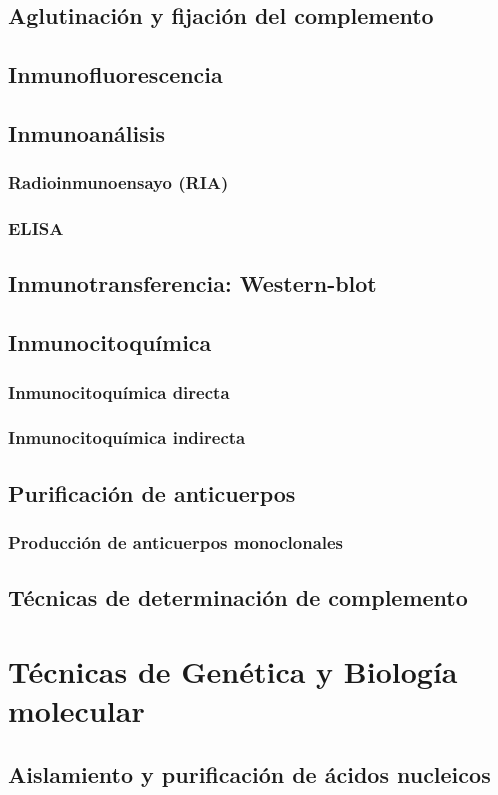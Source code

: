 \documentclass[10pt,a4paper,onecolumn,openany]{book}
\begin{document}
\section{Aglutinación y fijación del complemento}
\section{Inmunofluorescencia}
\section{Inmunoanálisis}
\subsection{Radioinmunoensayo (RIA)}
\subsection{ELISA}
\section{Inmunotransferencia: Western-blot}
\section{Inmunocitoquímica}
\subsection{Inmunocitoquímica directa}
\subsection{Inmunocitoquímica indirecta}
\section{Purificación de anticuerpos}
\subsection{Producción de anticuerpos monoclonales}
\section{Técnicas de determinación de complemento}
\chapter{Técnicas de Genética y Biología molecular}
\section{Aislamiento y purificación de ácidos nucleicos}
\end{document}
